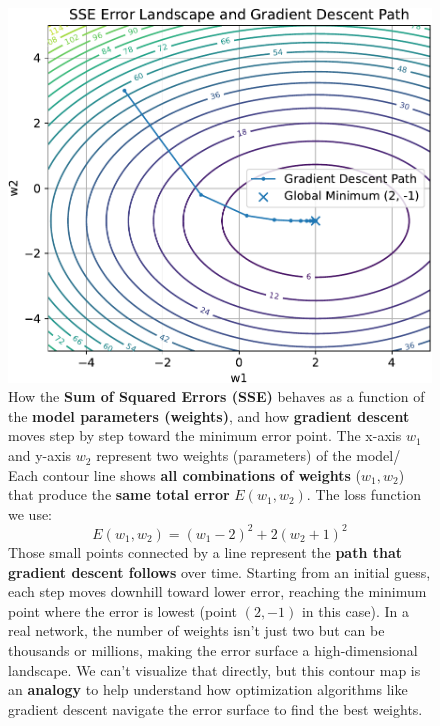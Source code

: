 \begin{figure}[!htp]
    \centering
    \includegraphics[width=.85\textwidth]{img/learning-and-optimization/error-geometric-interpretation-1.pdf}
    \captionsetup{singlelinecheck=off}
    \caption[]{How the \textbf{Sum of Squared Errors (SSE)} behaves as a function of the \textbf{model parameters (weights)}, and how \textbf{gradient descent} moves step by step toward the minimum error point. The x-axis $w_{1}$ and y-axis $w_{2}$ represent two weights (parameters) of the model/ Each contour line shows \textbf{all combinations of weights} ($w_{1}, w_{2}$) that produce the \textbf{same total error} $E(w_{1}, w_{2})$. The loss function we use:
    \begin{equation*}
        E\left(w_1, w_2\right) = \left(w_1 - 2\right)^2 + 2\left(w_2 + 1\right)^2
    \end{equation*}
    Those small points connected by a line represent the \textbf{path that gradient descent follows} over time. Starting from an initial guess, each step moves downhill toward lower error, reaching the minimum point where the error is lowest (point $(2, -1)$ in this case). In a real network, the number of weights isn't just two but can be thousands or millions, making the error surface a high-dimensional landscape. We can't visualize that directly, but this contour map is an \textbf{analogy} to help understand how optimization algorithms like gradient descent navigate the error surface to find the best weights.}
\end{figure}

\newpage

